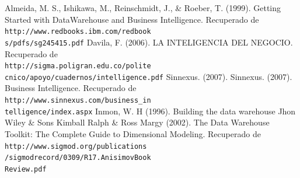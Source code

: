 \documentclass[twoside,twocolumn]{article}
\begin{document}

\begin{thebibliography}{99} 
    \bibitem{} 
    Almeida, M. S., Ishikawa, M., Reinschmidt, J., \& Roeber, T. (1999). Getting Started with DataWarehouse and Business Intelligence. Recuperado de 
    \\\texttt{http://www.redbooks.ibm.com/redbook\\s/pdfs/sg245415.pdf}
    \bibitem{} 
    Davila, F. (2006). LA INTELIGENCIA DEL NEGOCIO. Recuperado de 
    \\\texttt{http://sigma.poligran.edu.co/polite\\cnico/apoyo/cuadernos/intelligence.pdf}
    \bibitem{} 
    Sinnexus. (2007). Sinnexus. (2007). Business Intelligence. Recuperado de 
    \\\texttt{http://www.sinnexus.com/business\_in\\telligence/index.aspx}
    \bibitem{} 
    Inmon, W. H (1996). Building the data warehouse Jhon Wiley \& Sons Kimball Ralph \& Ross Margy (2002). The Data Warehouse Toolkit: The Complete Guide to Dimensional Modeling. Recuperado de 
    \\\texttt{http://www.sigmod.org/publications\\/sigmodrecord/0309/R17.AnisimovBook\\Review.pdf}
\end{thebibliography}
\end{document}

